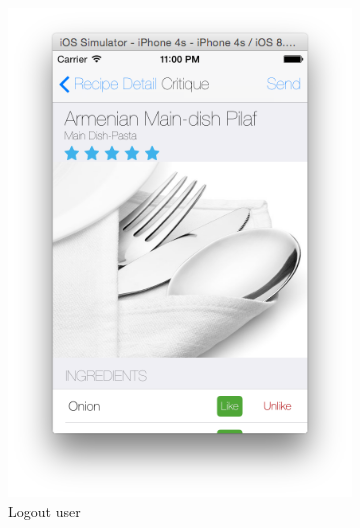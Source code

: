 	  \begin{figure}[h]
	  	\begin{subfigure}{.32\textwidth}
	  		\includegraphics[width=.9\linewidth]{figures/ch4_app_screen_shots/critique/critique_1.png}
	  		\caption{Logout user}
	  	\end{subfigure}
	  	\begin{subfigure}{.32\textwidth}

\end{subfigure}
\end{figure}
